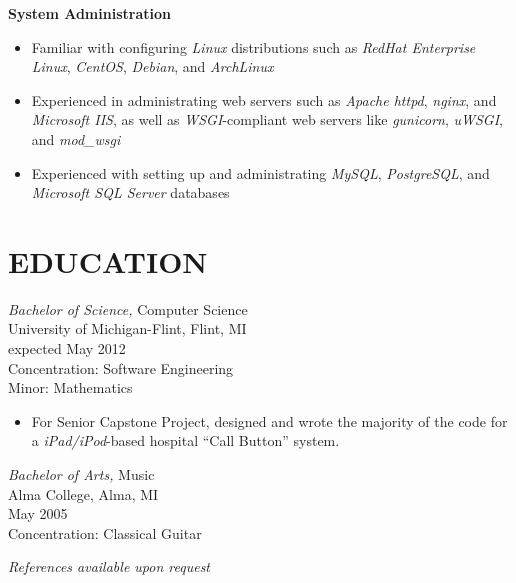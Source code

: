 \documentclass[line,margin]{res}
\begin{document}
\begin{resume}
\textbf{System Administration}
\vspace{2 mm}
\begin{itemize}
    \item Familiar with configuring {\sl Linux} distributions such as {\sl RedHat
            Enterprise Linux}, {\sl CentOS}, {\sl Debian}, and {\sl ArchLinux}
    \item Experienced in administrating web servers such as {\sl Apache httpd},
            {\sl nginx}, and {\sl Microsoft IIS}, as well as
            {\sl WSGI}-compliant web servers like {\sl gunicorn},
            {\sl uWSGI}, and {\sl mod\_wsgi}
    \item Experienced with setting up and administrating {\sl MySQL},
            {\sl PostgreSQL}, and {\sl Microsoft SQL Server} databases
\end{itemize}

\section{EDUCATION} {\sl Bachelor of Science,} Computer Science \\
                University of Michigan-Flint, Flint, MI \\
                expected May 2012 \\
                Concentration: Software Engineering \\
                Minor: Mathematics
                \vspace{2 mm}
                \begin{itemize}
                    \item For Senior Capstone Project, designed and wrote 
                            the majority of the code for a
                            {\sl iPad/iPod}-based hospital ``Call Button''
                            system.
                \end{itemize}

                {\sl Bachelor of Arts,} Music \\
                Alma College, Alma, MI \\
                May 2005 \\
                Concentration: Classical Guitar

\vspace{30 mm}


\end{resume}

\begin{flushleft}
{\sl References available upon request}
\end{flushleft}
\end{document}
